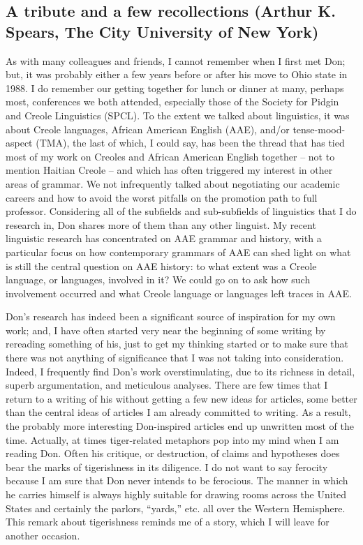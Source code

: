\documentclass[output=paper, colorlinks,citecolor=brown]{langscibook}
\begin{document}
\subsection{A tribute and a few recollections (Arthur K. Spears, The City University of New York)}

As with many colleagues and friends, I cannot remember when I first met Don; but, it was probably either a few years before or after his move to Ohio state in 1988. I do remember our getting together for lunch or dinner at many, perhaps most, conferences we both attended, especially those of the Society for Pidgin and Creole Linguistics (SPCL). To the extent we talked about linguistics, it was about Creole languages, African American English (AAE), and/or tense-mood-aspect (TMA), the last of which, I could say, has been the thread that has tied most of my work on Creoles and African American English together -- not to mention Haitian Creole -- and which has often triggered my interest in other areas of grammar. We not infrequently talked about negotiating our academic careers and how to avoid the worst pitfalls on the promotion path to full professor. 
Considering all of the subfields and sub-subfields of linguistics that I do research in, Don shares more of them than any other linguist. My recent linguistic research has concentrated on AAE grammar and history, with a particular focus on how contemporary grammars of AAE can shed light on what is still the central question on AAE history: to what extent was a Creole language, or languages, involved in it? We could go on to ask how such involvement occurred and what Creole language or languages left traces in AAE. 

Don’s research has indeed been a significant source of inspiration for my own work; and, I have often started very near the beginning of some writing by rereading something of his, just to get my thinking started or to make sure that there was not anything of significance that I was not taking into consideration. Indeed, I frequently find Don’s work overstimulating, due to its richness in detail, superb argumentation, and meticulous analyses. There are few times that I return to a writing of his without getting a few new ideas for articles, some better than the central ideas of articles I am already committed to writing. As a result, the probably more interesting Don-inspired articles end up unwritten most of the time. 
Actually, at times tiger-related metaphors pop into my mind when I am reading Don. Often his critique, or destruction, of claims and hypotheses does bear the marks of tigerishness in its diligence. I do not want to say ferocity because I am sure that Don never intends to be ferocious. The manner in which he carries himself is always highly suitable for drawing rooms across the United States and certainly the parlors, “yards,” etc. all over the Western Hemisphere. This remark about tigerishness reminds me of a story, which I will leave for another occasion. 
\end{document}
